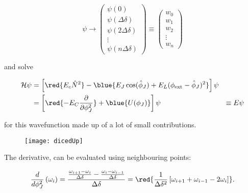 \[
  \psi \rightarrow \begin{pmatrix}
    \psi(0)\\
    \psi(\Delta \delta)\\
    \psi(2\Delta \delta)\\\vdots
    \\
    \psi(n\Delta \delta)
  \end{pmatrix}
  \equiv
  \begin{pmatrix}
    w_0\\
    w_1\\
    w_2\\
    \vdots\\
    w_{n}
  \end{pmatrix}
\]

\noindent and solve

\begin{equation}\label{eqn:flux_1}
  \begin{aligned}
    \mathcal{H}     \psi     &      =     \left[\red{E_c\hat{N}^2}     -
      \blue{E_J\cos(\hat{\phi}_J) +
        E_L(\phi_\text{ext}-\hat{\phi}_J)^2} \right]\psi\\
    &     =      \left[\red{-E_C\frac{\partial}{\partial\phi_J^2}}     +
      \blue{U(\phi_J)}\right]\psi &\equiv E\psi
  \end{aligned}
\end{equation}

\noindent for this wavefunction made up of a lot of small contributions.

\begin{figure}[h]
  \centering \texttt{[image: dicedUp]}
\end{figure}

\noindent

\noindent The derivative, can be evaluated using neighbouring points:

   \begin{equation}\label{eqn:flux_2}
     \frac{d}{d\phi_J^2}\left(\omega_i\right) = \frac{\frac{\omega_{i+1} - \omega_i}{\Delta\delta} - \frac{\omega_{i} - \omega_{i-1}}{\Delta\delta}}{\Delta\delta} = \red{\frac{1}{\Delta\delta^2}\left[\omega_{i+1}+\omega_{i-1}-2\omega_{i}\right]}.
   \end{equation}

